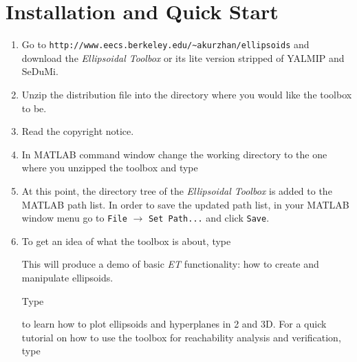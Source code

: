 \section{Installation and Quick Start}
\begin{enumerate}
\item Go to
\newline
{\tt http://www.eecs.berkeley.edu/\~{ }akurzhan/ellipsoids}
\newline
and download the {\it Ellipsoidal Toolbox} or its lite version stripped
of YALMIP and SeDuMi.
\item Unzip the distribution file into the directory where you would like
the toolbox to be.
\item Read the copyright notice.
\item In MATLAB command window change the working directory to the one where
you unzipped the toolbox and type
\item At this point, the directory tree of the {\it Ellipsoidal Toolbox} is
added to the MATLAB path list. In order to save the updated path list,
in your MATLAB window menu go to {\tt File} $\rightarrow$ {\tt Set Path...} and
click {\tt Save}.
\item To get an idea of what the toolbox is about, type

This will produce a demo of basic {\it ET} functionality: how to create
and manipulate ellipsoids.

Type

to learn how to plot ellipsoids and hyperplanes in 2 and 3D.
\newline
For a quick tutorial on how to use the toolbox for reachability analysis
and verification, type

\end{enumerate}
